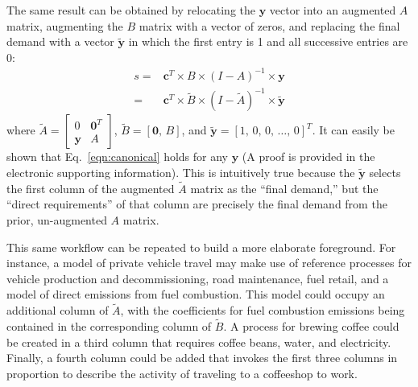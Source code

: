 The same result can be obtained by relocating the $\mathbf{y}$ vector into an augmented $A$ matrix, augmenting the $B$ matrix with a vector of zeros, and replacing the final demand with a vector $\tilde{\mathbf{y}}$ in which the first entry is 1 and all successive entries are 0:
\begin{equation}
  \begin{array}{cc}
s =& \mathbf{c}^T\times B\times\left(I-A\right)^{-1}\times\mathbf{y} \\
 =& \mathbf{c}^{T}\times\tilde{B}\times\left(I-\tilde{A}\right)^{-1}\times\tilde{\mathbf{y}}
  \end{array}
  \label{eqn:canonical}
\end{equation}
where
$\tilde{A} = \left[\begin{smallmatrix} 0 & \mathbf{0}^T \\ \mathbf{y} & A  \end{smallmatrix}\right]$,
$\tilde{B} = [ \mathbf{0},\, B ]$, and $\tilde{\mathbf{y}} =  [ 1,\, 0,\, 0 ,\,\ldots,\, 0]^{T}$.
It can easily be shown that Eq.~\ref{eqn:canonical} holds for any $\mathbf{y}$  (A proof is provided in the electronic supporting information).  This is intuitively true because the $\tilde{\mathbf{y}}$ selects the first column of the augmented $\tilde{A}$ matrix as the ``final demand,'' but the ``direct requirements'' of that column are precisely the final demand from the prior, un-augmented $A$ matrix.  

This same workflow can be repeated to build a more elaborate foreground.  For instance, a model of private vehicle travel may make use of reference processes for vehicle production and decommissioning, road maintenance, fuel retail, and a model of direct emissions from fuel combustion.  This model could occupy an additional column of $\tilde{A}$, with the coefficients for fuel combustion emissions being contained in the corresponding column of $\tilde{B}$.  A process for brewing coffee could be created in a third column that requires coffee beans, water, and electricity. Finally, a fourth column could be added that invokes the first three columns in proportion to describe the activity of traveling to a coffeeshop to work.%

